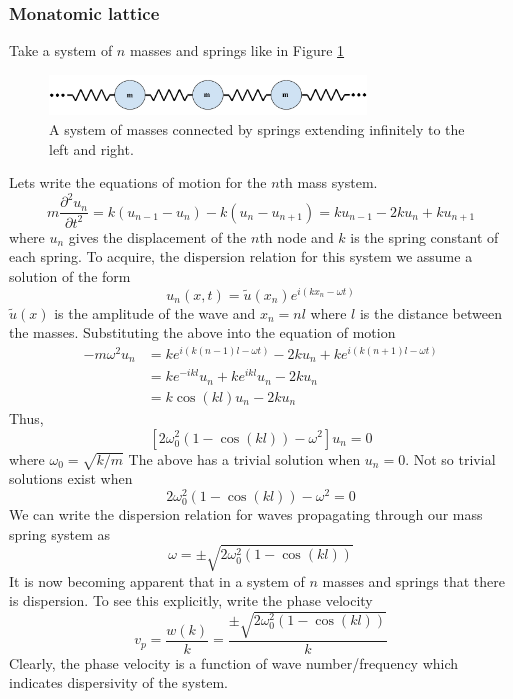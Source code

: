 \documentclass{article}
\begin{document}
\subsubsection{Monatomic lattice} \label{monatomic}
Take a system of $n$ masses and springs like in Figure \ref{fig:ms} 
\begin{figure}[!htbp]
	\centering
	\includegraphics[width=0.75\textwidth]{mass-spring.pdf}
	\caption{A system of masses connected by springs extending infinitely to 
	the left and right.}
	\label{fig:ms}
\end{figure}
Lets write the equations of motion for the $n$th mass system.
\begin{equation} \label{eqnms}
m\frac{\partial^2 u_n}{\partial t^2} = k(u_{n-1} - u_n) - k(u_n - u_{n+1}) = 
ku_{n-1} - 2ku_n + ku_{n+1} 
\end{equation}
where $u_n$ gives the displacement of the $n$th node and $k$ is the spring 
constant of each spring. To acquire, the dispersion relation for this system we 
assume a solution of the form
\begin{equation} \label{bloch}
u_n(x,t) = \tilde{u}(x_n)e^{i(kx_n - \omega t)}
\end{equation}
$\tilde{u}(x)$ is the amplitude of the wave and $x_n = nl$ where $l$ is the 
distance between the masses. Substituting the above into the equation of motion
\begin{align*}
-m \omega^2 u_n   &= ke^{i(k(n-1)l - \omega t)} - 2ku_n + ke^{i(k(n+1)l - 
\omega t)} \\
&= ke^{-ikl}u_n + ke^{ikl}u_n - 2ku_n \\
&= k\cos(kl)u_n - 2ku_n
\end{align*}
Thus,
\begin{equation}
\left[2\omega_0^2(1 - \cos(kl)) - \omega^2\right]u_n = 0
\end{equation}
where $\omega_0 = \sqrt{k/m}$ The above has a trivial solution when $u_n = 0$. 
Not so trivial solutions exist when
\begin{equation}
2\omega_0^2(1 - \cos(kl)) - \omega^2= 0
\end{equation}
We can write the dispersion relation for waves propagating through our mass 
spring system as
\begin{equation} \label{monatomicdisp}
\omega = \pm \sqrt{2\omega_0^2(1 - \cos(kl))}
\end{equation}
It is now becoming apparent that in a system of $n$ masses and springs that 
there is dispersion. To see this explicitly, write the phase velocity
\begin{equation}
v_p = \frac{w(k)}{k} = \frac{\pm\sqrt{2\omega_0^2(1 - \cos(kl))}}{k}
\end{equation}
Clearly, the phase velocity is a function of wave number/frequency which 
indicates dispersivity of the system.
\end{document}
